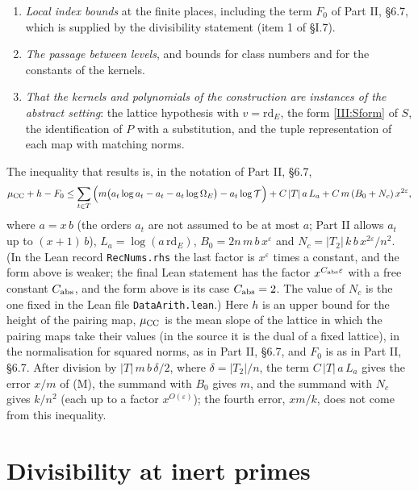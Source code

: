 \documentclass[11pt,letterpaper]{article}
\begin{document}
\begin{enumerate}[label=\textup{(\roman*)},leftmargin=2.4em]
by the factor $\mathrm{rd}_E/\sqrt d$), and that the same constant appears in the covolume of the lattices. This is where
the Chowla--Selberg formula is used, and where the two occurrences of $\log\Omega$ cancel up to a small error.
\item \emph{Local index bounds} at the finite places, including the term $F_0$ of Part II, \S6.7, which is
supplied by the divisibility statement (item 1 of \S I.7).
\item \emph{The passage between levels}, and bounds for class numbers and for the constants of the kernels.
\item \emph{That the kernels and polynomials of the construction are instances of the abstract setting}:
the lattice hypothesis with $v=\mathrm{rd}_E$, the form \eqref{III:Sform} of $S$, the identification of $P$ with
a substitution, and the tuple representation of each map with matching norms.
\end{enumerate}
The inequality that results is, in the notation of Part II, \S6.7,
\begin{equation}\label{III:sizefinal}
 \mu_{\rm CC}+h-F_0\le\sum_{t\in T}\Big(m\big(a_t\log a_t-a_t-a_t\log\Omega_E\big)-a_t\log\mathcal T\Big)
 +C\,|T|\,a\,L_a+C\,m\,(B_0+N_c)\,x^{2\varepsilon},
\end{equation}
where $a=x\,b$ (the orders $a_t$ are not assumed to be at most $a$; Part II allows $a_t$ up to $(x+1)\,b$), $L_a=\log(a\,\mathrm{rd}_E)$, $B_0=2n\,m\,b\,x^{\varepsilon}$ and $N_c=|T_2|\,k\,b\,x^{2\varepsilon}/n^2$.
(In the Lean record \texttt{RecNums.rhs} the last factor is $x^{\varepsilon}$ times a constant, and the form above is weaker; the final Lean statement has the factor $x^{C_{\rm abs}\varepsilon}$ with a free constant $C_{\rm abs}$, and the form above is its case $C_{\rm abs}=2$. The
value of $N_c$ is the one fixed in the Lean file \texttt{DataArith.lean}.)
Here $h$ is an upper bound for the height of the pairing map, $\mu_{\rm CC}$ is the mean slope of the lattice in which the pairing maps take their values (in the source it is the dual of a fixed lattice), in the normalisation for squared norms, as in Part II, \S6.7, and $F_0$ is as in Part II, \S6.7. After division by $|T|\,m\,b\,\delta/2$, where $\delta=|T_2|/n$, the term $C\,|T|\,a\,L_a$ gives the
error $x/m$ of (M), the summand with $B_0$ gives $m$, and the summand with $N_c$ gives $k/n^2$ (each up to a
factor $x^{O(\varepsilon)}$); the fourth error, $xm/k$, does not come from this inequality.

\section{Divisibility at inert primes}
\end{document}
